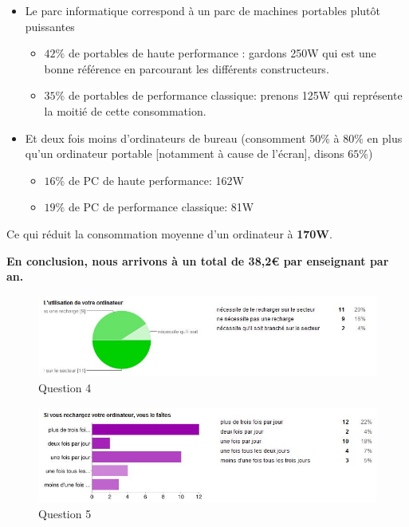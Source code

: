 \documentclass[a4paper,11pt,french]{article}
\begin{document}
\begin{itemize}
\item Le parc informatique correspond à un parc de machines portables plutôt puissantes
  \begin{itemize}
  \item $42\%$ de portables de haute performance : gardons 250W qui est une bonne référence en parcourant les différents constructeurs.
  \item $35\%$ de portables de performance classique: prenons 125W qui représente la moitié de cette consommation.  
  \end{itemize} 
\item Et deux fois moins d'ordinateurs de bureau (consomment $50\%$ à $80\%$ en plus qu'un ordinateur portable [notamment à cause de l'écran], disons $65\%$)
  \begin{itemize}
  \item $16\%$ de PC de haute performance: 162W
  \item $19\%$ de PC de performance classique: 81W
  \end{itemize} 
\end{itemize}

Ce qui réduit la consommation moyenne d'un ordinateur à \textbf{170W}.\\
\begin{center}
\textbf{En conclusion, nous arrivons à un total de 38,2\euro{} par enseignant par an.}
\end{center}

\begin{figure}[h!]
\includegraphics[width=\textwidth]{i9.JPG}
\caption{Question 4}
\label{i9}
\end{figure}

\begin{figure}[h!]
\includegraphics[width=\textwidth]{i10.JPG}
\caption{Question 5}
\label{i10}
\end{figure}
\end{document}
